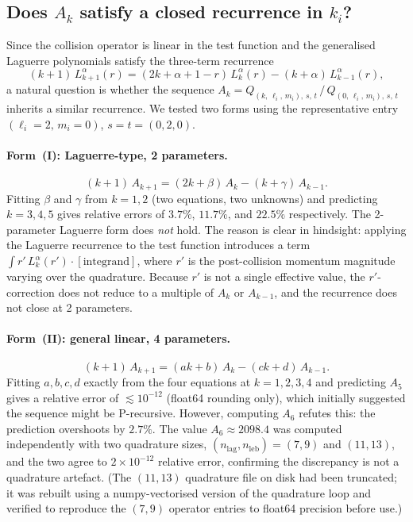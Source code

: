 \documentclass{article}
\begin{document}
\subsection*{Does $A_k$ satisfy a closed recurrence in $k_i$?}

Since the collision operator is linear in the test function and the generalised
Laguerre polynomials satisfy the three-term recurrence
\[
  (k+1)\,L_{k+1}^{\alpha}(r)
  = (2k+\alpha+1-r)\,L_k^{\alpha}(r)
  - (k+\alpha)\,L_{k-1}^{\alpha}(r),
\]
a natural question is whether the sequence
$A_k = Q_{(k,\,\ell_i,\,m_i),\,s,\,t}\,/\,Q_{(0,\,\ell_i,\,m_i),\,s,\,t}$
inherits a similar recurrence.
We tested two forms using the representative entry
$(\ell_i{=}2,\,m_i{=}0)$, $s{=}t{=}(0,2,0)$.

\paragraph{Form~(I): Laguerre-type, 2 parameters.}
\[
  (k+1)\,A_{k+1} = (2k+\beta)\,A_k - (k+\gamma)\,A_{k-1}.
\]
Fitting $\beta$ and $\gamma$ from $k=1,2$ (two equations, two unknowns) and
predicting $k=3,4,5$ gives relative errors of $3.7\%$, $11.7\%$, and $22.5\%$
respectively.  The 2-parameter Laguerre form does \emph{not} hold.
The reason is clear in hindsight: applying the Laguerre recurrence to the
test function introduces a term $\int r'\,L_k^{\alpha}(r')\cdot[\text{integrand}]$,
where $r'$ is the post-collision momentum magnitude varying over the quadrature.
Because $r'$ is not a single effective value, the $r'$-correction does not reduce
to a multiple of $A_k$ or $A_{k-1}$, and the recurrence does not close at 2 parameters.

\paragraph{Form~(II): general linear, 4 parameters.}
\[
  (k+1)\,A_{k+1} = (ak+b)\,A_k - (ck+d)\,A_{k-1}.
\]
Fitting $a,b,c,d$ exactly from the four equations at $k=1,2,3,4$ and predicting
$A_5$ gives a relative error of $\lesssim 10^{-12}$ (float64 rounding only),
which initially suggested the sequence might be P-recursive.
However, computing $A_6$ refutes this: the prediction overshoots by $2.7\%$.
The value $A_6 \approx 2098.4$ was computed independently with two quadrature
sizes, $(n_\mathrm{lag},n_\mathrm{leb})=(7,9)$ and $(11,13)$, and the two
agree to $2\times 10^{-12}$ relative error, confirming the discrepancy is not
a quadrature artefact.
(The $(11,13)$ quadrature file on disk had been truncated; it was rebuilt
using a numpy-vectorised version of the quadrature loop and verified to
reproduce the $(7,9)$ operator entries to float64 precision before use.)
\end{document}
